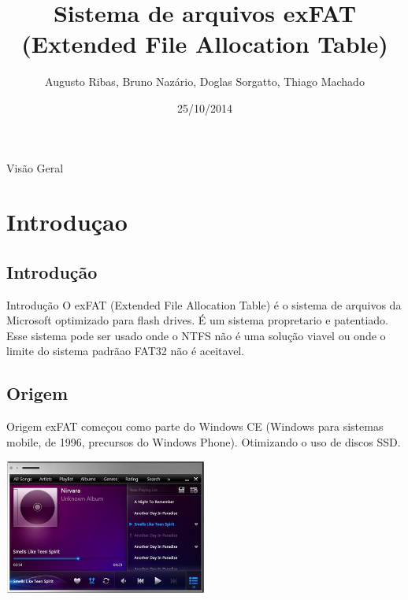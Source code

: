 \documentclass[11pt]{beamer}
\author{Augusto Ribas, Bruno Nazário, Doglas Sorgatto, Thiago Machado}
\title{Sistema de arquivos exFAT (Extended File Allocation Table)}
\institute{Sistemas Operacionais}
\date{25/10/2014}
\begin{document}
\begin{frame}
\titlepage
\end{frame}

\begin{frame}{Visão Geral}
\scriptsize\tableofcontents
\end{frame}

\section{Introduçao}

\subsection{Introdução}
\begin{frame}{Introdução}
O exFAT (Extended File Allocation Table) é o sistema de arquivos da Microsoft optimizado para flash drives. É um sistema propretario e patentiado.\\
Esse sistema pode ser usado onde o NTFS não é uma solução viavel ou onde o limite do sistema padrãao FAT32 não é aceitavel.
\end{frame}

\subsection{Origem}
\begin{frame}{Origem}
exFAT começou como parte do Windows CE (Windows para sistemas mobile, de 1996, precursos do Windows Phone). Otimizando o uso de discos SSD.

\begin{center}
 \includegraphics[width=0.5\textwidth]{WindowsCE7.png}
\end{center}
\end{frame}
\end{document}
